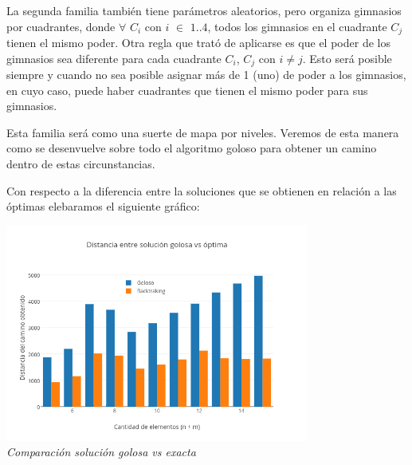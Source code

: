   
La segunda familia también tiene parámetros aleatorios, pero organiza gimnasios por cuadrantes, donde $\forall$ $C_i$ con $i$ $\in$ ${1..4}$, todos los gimnasios en el cuadrante $C_j$ tienen el mismo poder. Otra regla que trató de aplicarse es que el poder de los gimnasios sea diferente para cada cuadrante $C_i$, $C_j$ con $i \neq j$. Esto será posible siempre y cuando no sea posible asignar m\'as de 1 (uno) de poder a los gimnasios, en cuyo caso, puede haber cuadrantes que tienen el mismo poder para sus gimnasios.

Esta familia será como una suerte de mapa por niveles. Veremos de esta manera como se desenvuelve sobre todo el algoritmo goloso para obtener un camino dentro de estas circunstancias.\\

 
   \begin{figure} [!ht]
 \centering
       \label{fig:randomexacto}
    \label{fig:randomgoloso}
    \end{figure}
  
  Con respecto a la diferencia entre la soluciones que se obtienen en relaci\'on a las \'optimas elebaramos el siguiente gráfico:\\
 
\vspace*{0.3cm} \vspace*{0.3cm}
  \begin{center}
 \includegraphics[width=0.75\textwidth]{./EJ2/random.png}
\\{\textit{Comparación solución golosa vs exacta}}
  \end{center}
